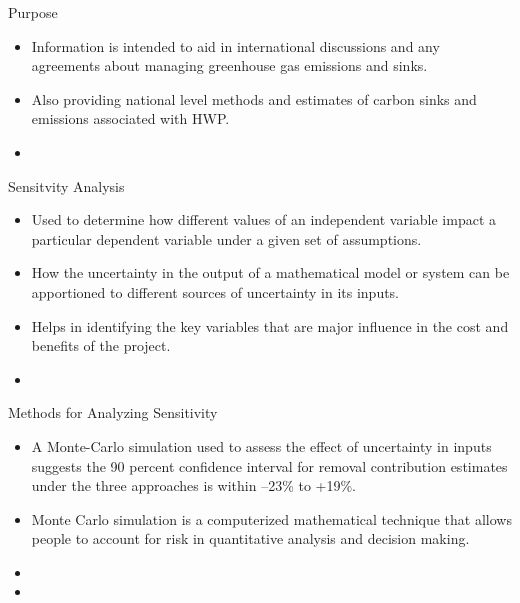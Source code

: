 \documentclass[final]{beamer}\usepackage[]{graphicx}\usepackage[]{color}
\begin{document}
\begin{frame}[fragile]
\begin{columns}[t]

\begin{column}{0.23\linewidth}
\begin{minipage}[t][.955\textheight]{\linewidth} 

\begin{block}{Purpose}
\vspace{0ex}
\begin{itemize}
\item Information is intended to aid in international discussions and any agreements about managing greenhouse gas emissions and sinks.
\item Also providing national level methods and estimates of carbon sinks and emissions associated with HWP.
\item
\end{itemize}
\vspace{-1.5ex}
\end{block}
\vfill


\vspace{0ex}
\begin{block}{Sensitvity Analysis}
\begin{itemize}
\item Used to determine how different values of an independent variable impact a particular dependent variable under a given set of assumptions. 
\item How the uncertainty in the output of a mathematical model or system can be apportioned to different sources of uncertainty in its inputs.
\item Helps in identifying the key variables that are major influence in the cost and benefits of the project.
\item 
\end{itemize}
\vspace{0ex}
\end{block}
\vfill

\begin{block}{Methods for Analyzing Sensitivity}
\begin{itemize}
\item A Monte-Carlo simulation used to assess the effect of uncertainty in inputs suggests the 90 percent confidence interval for removal contribution estimates under the three approaches is within –23\% to +19\%.
\vspace{2ex}
\item Monte Carlo simulation is a computerized mathematical technique that allows people to account for risk in quantitative analysis and decision making.
\item
\item
\end{itemize}
\vspace{0ex}
\vfill
\end{block}
\vfill


\end{minipage}
\end{column}
\end{columns}
\end{frame}
\end{document}
